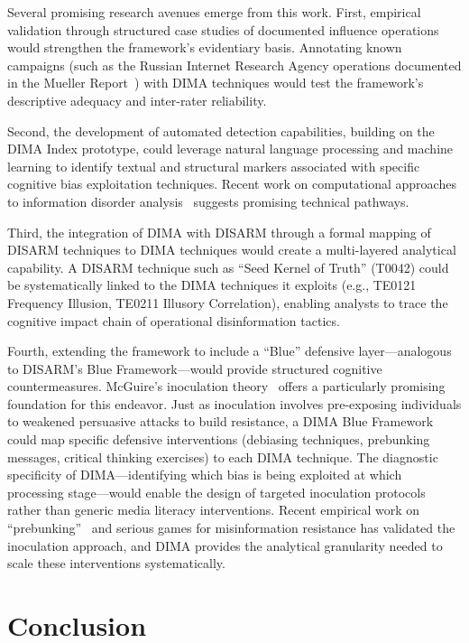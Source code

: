 \documentclass[11pt,a4paper]{article}
\begin{document}
Several promising research avenues emerge from this work. First, empirical validation through structured case studies of documented influence operations would strengthen the framework's evidentiary basis. Annotating known campaigns (such as the Russian Internet Research Agency operations documented in the Mueller Report~\cite{mueller2019}) with DIMA techniques would test the framework's descriptive adequacy and inter-rater reliability.

Second, the development of automated detection capabilities, building on the DIMA Index prototype, could leverage natural language processing and machine learning to identify textual and structural markers associated with specific cognitive bias exploitation techniques. Recent work on computational approaches to information disorder analysis~\cite{demeo2025} suggests promising technical pathways.

Third, the integration of DIMA with DISARM through a formal mapping of DISARM techniques to DIMA techniques would create a multi-layered analytical capability. A DISARM technique such as ``Seed Kernel of Truth'' (T0042) could be systematically linked to the DIMA techniques it exploits (e.g., TE0121 Frequency Illusion, TE0211 Illusory Correlation), enabling analysts to trace the cognitive impact chain of operational disinformation tactics.

Fourth, extending the framework to include a ``Blue'' defensive layer---analogous to DISARM's Blue Framework---would provide structured cognitive countermeasures. McGuire's inoculation theory~\cite{mcguire1961, mcguire1964} offers a particularly promising foundation for this endeavor. Just as inoculation involves pre-exposing individuals to weakened persuasive attacks to build resistance, a DIMA Blue Framework could map specific defensive interventions (debiasing techniques, prebunking messages, critical thinking exercises) to each DIMA technique. The diagnostic specificity of DIMA---identifying which bias is being exploited at which processing stage---would enable the design of targeted inoculation protocols rather than generic media literacy interventions. Recent empirical work on ``prebunking''~\cite{roozenbeek2019, basol2020} and serious games for misinformation resistance has validated the inoculation approach, and DIMA provides the analytical granularity needed to scale these interventions systematically.

\section{Conclusion}
\label{sec:conclusion}
\end{document}
